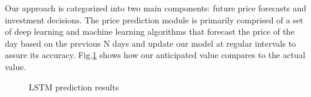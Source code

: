 \documentclass{mcmthesis}
\begin{document}
\begin{memo}
Our approach is categorized into two main components: future price forecasts and investment decisions. The price prediction module is primarily comprised of a set of deep learning and machine learning algorithms that forecast the price of the day based on the previous N days and update our model at regular intervals to assure its accuracy. Fig.\ref{fig:predict_new} shows how our anticipated value compares to the actual value.
\begin{figure}[H]
	\centering
	\caption{LSTM prediction results}
	\label{fig:predict_new}
\end{figure}


\end{memo}
\end{document}
